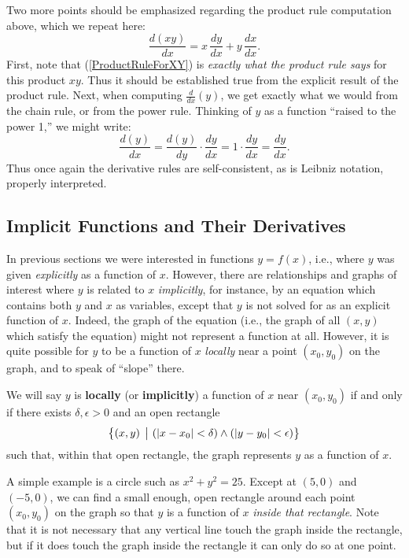 Two more points should be emphasized regarding the
product rule computation above, which we repeat here:
\begin{equation}
\frac{d(xy)}{dx}=x\,\frac{dy}{dx}+y\,\frac{dx}{dx}.\label{ProductRuleForXY}
\end{equation}
First, note that (\ref{ProductRuleForXY}) is {\it exactly what the
product rule says} for this product $xy$.  Thus it should be 
established true from the explicit result of the product rule.
Next, when computing $\frac{d}{dx}(y)$, we get exactly what we would
from the chain rule, or from the power rule.  Thinking of $y$
as a function ``raised to the power 1,'' we might write:
\begin{equation}\frac{d(y)}{dx}=\frac{d(y)}{dy}\cdot\frac{dy}{dx}
=1\cdot\frac{dy}{dx}=\frac{dy}{dx}.\label{LeibnizDY/DX=DY/DX}
\end{equation}
Thus once again the derivative rules are self-consistent,
as is Leibniz notation, properly interpreted.





\newpage\subsection{Implicit Functions and Their Derivatives}
In previous sections we were interested in functions
$y=f(x)$, i.e., where $y$ was given {\it explicitly}
as a function of $x$.  However, there are relationships and
graphs of interest where $y$ is related to $x$ {\it implicitly},
for instance, by an equation which contains
both $y$ and $x$ as variables, except that
$y$ is not solved for as an explicit function of $x$.
Indeed, the graph of the equation
(i.e., the graph of all $(x,y)$ which satisfy
the equation) might not represent a function
at all.  However, it is quite possible for
$y$ to be a function of $x$ {\it locally} near
a point $(x_0,y_0)$ on the graph, and to speak of ``slope'' there.  

\begin{definition}
We will say $y$ is {\bf locally} (or {\bf implicitly}) a function of $x$
near $(x_0,y_0)$ if and only if there exists
$\delta,\epsilon>0$ and an open rectangle 
$$\left\{(x,y)\,\left.\vphantom{M_M^M}\right|
\, \left(|x-x_0|<\delta\right)\wedge\left(|y-y_0|<\epsilon\right)\right\}$$
such that, within that open rectangle, the 
graph represents $y$ as a function
of $x$.
\end{definition}
A simple example is a circle such as $x^2+y^2=25$.
Except at $(5,0)$ and $(-5,0)$, we can find a small
enough, open rectangle around each point $(x_0,y_0)$ on 
the graph so that $y$ is a function of $x$ 
{\it inside that rectangle}.  Note that it is not necessary
that any vertical line touch the graph inside the rectangle, 
but if it 
does touch the graph inside the rectangle it can only do so 
at one point.

